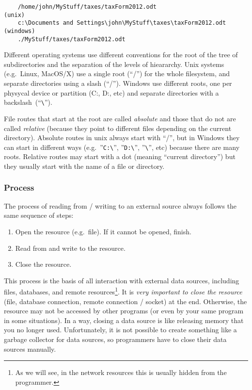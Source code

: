 \begin{verbatim}
    /home/john/MyStuff/taxes/taxForm2012.odt                     (unix)
    c:\Documents and Settings\john\MyStuff\taxes\taxForm2012.odt (windows)
    ./MyStuff/taxes/taxForm2012.odt
\end{verbatim}

Different operating systems use different conventions for the root of
the tree of subdirectories and the separation of the levels of
hieararchy. Unix systems (e.g.~Linux, MacOS/X) use a single root
(``/'') for the whole filesystem, and separate directories using a
slash (``/''). Windows use different roots, one per physycal device or
partition (C:, D:, etc) and separate directories with a 
backslash~(``\verb+\+''). 

File routes that start at the root are called \emph{absolute} and
those that do not are called \emph{relative} (because they point to
different files depending on the current directory). Absolute routes in
unix always start with ``/'', but in Windows they can start in
different ways (e.g.~''\verb+C:\+'', ''\verb+D:\+'', ''\verb+\+'',
etc) because there are many roots. Relative routes may start with
a dot (meaning ``current directory'') but they usually start with the
name of a file or directory. 


\subsubsection*{Process}
\label{sec:process}

The process of reading from / writing to an external source always
follows the same sequence of steps:

\begin{enumerate}
\item Open the resource (e.g.~file). If it cannot be opened, finish.
\item Read from and write to the resource.
\item Close the resource. 
\end{enumerate}

This process is the basis of all interaction with external data
sources, including files, databases, and remote resources\footnote{As
  we will see, in the network resources this is usually hidden from
  the programmer.}.
It is \emph{very important to close the resource} (file, database
connection, remote connection / socket) at the
end. Otherwise, the resource may not be accessed by other programs (or
even by your same program in some situations). In a way, closing a
data source is like releasing memory that you no longer
used. Unfortunately, it is not possible to create something like a
garbage collector for data sources, so programmers have to close their
data sources manually.

